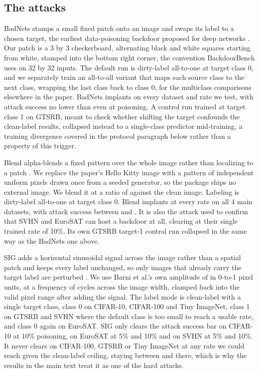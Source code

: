 \subsection{The attacks}
\label{app:attacks}

BadNets stamps a small fixed patch onto an image and swaps its label to a chosen target, the earliest data-poisoning backdoor proposed for deep networks \cite{gu2017badnets}. Our patch is a 3 by 3 checkerboard, alternating black and white squares starting from white, stamped into the bottom right corner, the convention BackdoorBench uses on 32 by 32 inputs. The default run is dirty-label all-to-one at target class 0, and we separately train an all-to-all variant that maps each source class to the next class, wrapping the last class back to class 0, for the multiclass comparisons elsewhere in the paper. BadNets implants on every dataset and rate we test, with attack success no lower than \AttackBadnetATwooAsrMin{} even at \PanelRateLow{} poisoning. A control run trained at target class 1 on GTSRB, meant to check whether shifting the target confounds the clean-label results, collapsed instead to a single-class predictor mid-training, a training divergence covered in the protocol paragraph below rather than a property of this trigger.

Blend alpha-blends a fixed pattern over the whole image rather than localizing to a patch \cite{chen2017targeted}. We replace the paper's Hello Kitty image with a pattern of independent uniform pixels drawn once from a seeded generator, so the package ships no external image. We blend it at a ratio of \AttackBlendAlpha{} against the clean image. Labeling is dirty-label all-to-one at target class 0. Blend implants at every rate on all 4 main datasets, with attack success between \AttackBlendAsrMin{} and \AttackBlendAsrMax{}. It is also the attack used to confirm that SVHN and EuroSAT can host a backdoor at all, clearing at their single trained rate of 10\%. Its own GTSRB target-1 control run collapsed in the same way as the BadNets one above.

SIG adds a horizontal sinusoidal signal across the image rather than a spatial patch and keeps every label unchanged, so only images that already carry the target label are perturbed \cite{barni2019sig}. We use Barni et al.'s own amplitude of \AttackSigAmplitude{} in 0-to-1 pixel units, at a frequency of \AttackSigFrequency{} cycles across the image width, clamped back into the valid pixel range after adding the signal. The label mode is clean-label with a single target class, class 0 on CIFAR-10, CIFAR-100 and Tiny ImageNet, class 1 on GTSRB and SVHN where the default class is too small to reach a usable rate, and class 0 again on EuroSAT. SIG only clears the attack success bar on CIFAR-10 at 10\% poisoning, on EuroSAT at 5\% and 10\% and on SVHN at 5\% and 10\%. It never clears on CIFAR-100, GTSRB or Tiny ImageNet at any rate we could reach given the clean-label ceiling, staying between \AttackSigAsrNeverClearingMin{} and \AttackSigAsrNeverClearingMax{} there, which is why the results in the main text treat it as one of the hard attacks.

